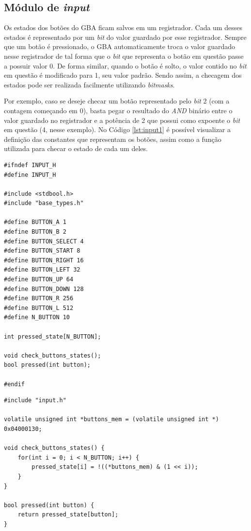 \subsection{Módulo de \textit{input}}

Os estados dos botões do GBA ficam salvos em um registrador. Cada um desses estados é representado por um \textit{bit} do valor guardado por esse registrador. Sempre que um botão é pressionado, o GBA automaticamente troca o valor guardado nesse registrador de tal forma que o \textit{bit} que representa o botão em questão passe a possuir valor 0. De forma similar, quando o botão é solto, o valor contido no \textit{bit} em questão é modificado para 1, seu valor padrão. Sendo assim, a checagem dos estados pode ser realizada facilmente utilizando \textit{bitmasks}.

Por exemplo, caso se deseje checar um botão representado pelo \textit{bit} 2 (com a contagem começando em 0), basta pegar o resultado do \textit{AND} binário entre o valor guardado no registrador e a potência de 2 que possui como expoente o \textit{bit} em questão (4, nesse exemplo). No Código \ref{lst:input1} é possível visualizar a definição das constantes que representam os botões, assim como a função utilizada para checar o estado de cada um deles.

\begin{lstlisting}[float,caption={Cabeçalho do módulo de \textit{input}.},label={lst:input1}]
#ifndef INPUT_H
#define INPUT_H

#include <stdbool.h>
#include "base_types.h"

#define BUTTON_A 1
#define BUTTON_B 2
#define BUTTON_SELECT 4
#define BUTTON_START 8
#define BUTTON_RIGHT 16
#define BUTTON_LEFT 32
#define BUTTON_UP 64
#define BUTTON_DOWN 128
#define BUTTON_R 256
#define BUTTON_L 512
#define N_BUTTON 10

int pressed_state[N_BUTTON];

void check_buttons_states();
bool pressed(int button);

#endif
\end{lstlisting}

\begin{lstlisting}[float,caption={Código-fonte do módulo de \textit{input}.}]
#include "input.h"

volatile unsigned int *buttons_mem = (volatile unsigned int *) 0x04000130;

void check_buttons_states() {
    for(int i = 0; i < N_BUTTON; i++) {
        pressed_state[i] = !((*buttons_mem) & (1 << i));
    }
}

bool pressed(int button) {
    return pressed_state[button];
}
\end{lstlisting}


